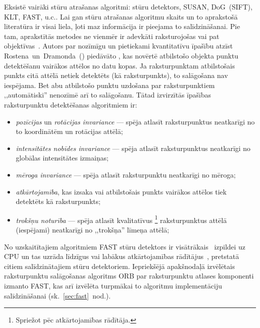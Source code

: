 Eksistē vairāki stūru atrašanas algoritmi:  stūru detektors,
SUSAN, DoG~(SIFT), KLT, FAST, u.c.. 
Lai gan stūru atrašanas algoritmu skaits un to aprakstošā literatūra ir
visai liela, ļoti maz informācija ir pieejama to salīdzināšanai. Pie
tam, aprakstītās metodes ne vienmēr ir adevkāti raksturojošas vai pat
objektīvas~\cite{Mokhtarian}\cite{FAST}. Autors par nozīmīgu un 
pietiekami kvantitatīvu īpašību atzīst 
Rostena~un~Dramonda\cite{FAST}~() piedāvāto
, kas novērtē atbilstošo objekta punktu detektēšanu
vairākos attēlos no datu kopas. Ja raksturpunktam atbilstošais punkts
citā attēlā netiek detektēts (kā raksturpunkts),
to salāgošana nav iespējama.
Bet abu atbilstošo punktu uzdošana par raksturpunktiem ,,automātiski''
nenozīmē arī to salāgošanu.
Tātad izvirzītās īpašības raksturpunktu detektēšanas algoritmiem ir:
\begin{itemize}
	\item \emph{pozīcijas} un \emph{rotācijas invariance} --- spēja atlasīt
		raksturpunktus neatkarīgi no to koordinātēm un rotācijas attēlā;
	\item \emph{intensitātes nobīdes invariance} --- spēja atlasīt
		raksturpunktus neatkarīgi no globālas intensitātes izmaiņas;
	\item \emph{mēroga invariance} --- spēja atlasīt raksturpunktu
		neatkarīgi no mēroga;
	\item \emph{atkārtojamība}, kas izsaka vai atbilstošais punkts vairākos
		attēlos tiek detektēts kā raksturpunkts;
	\item \emph{trokšņu noturība} --- spēja atlasīt kvalitatīvus%
			\footnote{Spriežot pēc atkārtojamības rādītāja.}
		raksturpunktus attēlā (iespējami) neatkarīgi no ,,trokšņa'' līmeņa attēlā;
\end{itemize}

No uzskaitītajiem algoritmiem FAST stūru detektors ir
visātrākais~\cite{Rosten-tracking}\cite{FAST} izpildei uz CPU un
tas uzrāda līdzīgus vai labākus atkārtojamības rādītājus~\cite{FAST},
pretstatā citiem salīdzinātajiem stūru detektoriem. Iepriekšējā apakšnodaļā
izvēlētais raksturpunktu salāgošanas algoritms ORB par raksturpunktu atlases
komponenti izmanto FAST, kas arī izvēlēta
turpmākai to algoritmu implementāciju salīdzināšanai
(sk.~\ref{sec:fast}~nod.).

